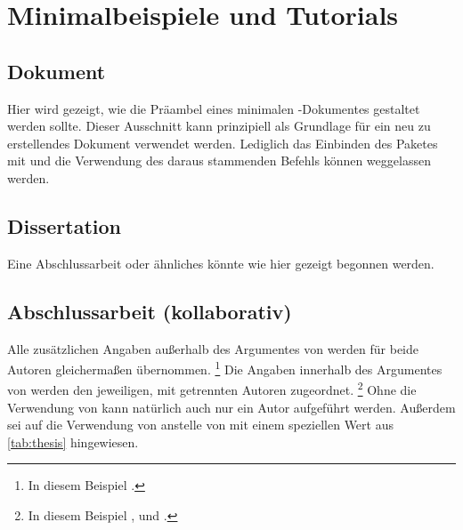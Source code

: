 \chapter{Minimalbeispiele und Tutorials}
\label{sec:exmpl}

\section{Dokument}
Hier wird gezeigt, wie die Präambel eines minimalen -Dokumentes 
gestaltet werden sollte. Dieser Ausschnitt kann prinzipiell als Grundlage für 
ein neu zu erstellendes Dokument verwendet werden. Lediglich das Einbinden des 
Paketes  mit  und 
die Verwendung des daraus stammenden Befehls  können 
weggelassen werden.

\section{Dissertation}
\label{sec:exmpl:dissertation}
Eine Abschlussarbeit oder ähnliches könnte wie hier gezeigt begonnen werden.

\section{Abschlussarbeit (kollaborativ)}
\label{sec:exmpl:thesis}
Alle zusätzlichen Angaben außerhalb des Argumentes von  werden 
für beide Autoren gleichermaßen übernommen.%
\footnote{In diesem Beispiel .}
Die Angaben innerhalb des Argumentes von  werden den jeweiligen, 
mit  getrennten Autoren zugeordnet.%
\footnote{%
  In diesem Beispiel ,  und 
  .
}
Ohne die Verwendung von  kann natürlich auch nur ein Autor 
aufgeführt werden. Außerdem sei auf die Verwendung von  anstelle 
von  mit einem speziellen Wert aus \autoref{tab:thesis} 
hingewiesen.

